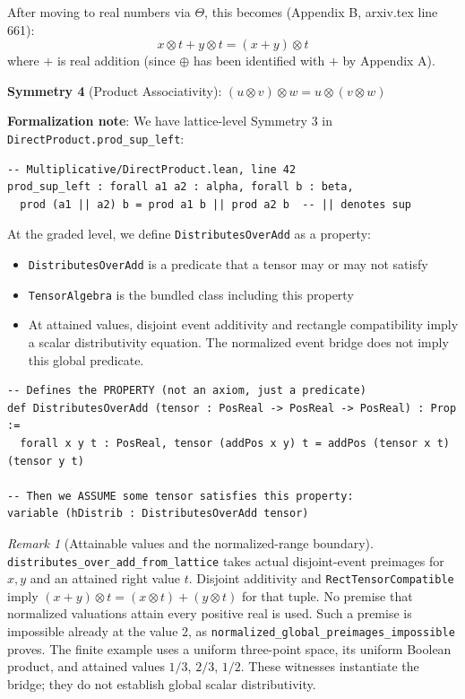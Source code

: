 \documentclass[11pt]{article}
\theoremstyle{definition}
\theoremstyle{remark}
\newtheorem{remark}[theorem]{Remark}
\begin{document}
After moving to real numbers via $\Theta$, this becomes (Appendix B, arxiv.tex line 661):
\[ x \otimes t + y \otimes t = (x + y) \otimes t \]
where $+$ is real addition (since $\oplus$ has been identified with $+$ by Appendix A).

\textbf{Symmetry 4} (Product Associativity): $(u \otimes v) \otimes w = u \otimes (v \otimes w)$

\textbf{Formalization note}: We have lattice-level Symmetry 3 in \texttt{DirectProduct.prod\_sup\_left}:
\begin{lstlisting}
-- Multiplicative/DirectProduct.lean, line 42
prod_sup_left : forall a1 a2 : alpha, forall b : beta,
  prod (a1 || a2) b = prod a1 b || prod a2 b  -- || denotes sup
\end{lstlisting}

At the graded level, we define \texttt{DistributesOverAdd} as a property:
\begin{itemize}
\item \texttt{DistributesOverAdd} is a predicate that a tensor may or may not satisfy
\item \texttt{TensorAlgebra} is the bundled class including this property
\item At attained values, disjoint event additivity and rectangle compatibility imply a scalar distributivity equation. The normalized event bridge does not imply this global predicate.
\end{itemize}

\begin{lstlisting}[caption={Distributivity property (\href{https://github.com/zariuq/ks-foundations-of-inference/blob/main/KnuthSkilling/Multiplicative/Basic.lean}{Multiplicative/Basic.lean})},numbers=none]
-- Defines the PROPERTY (not an axiom, just a predicate)
def DistributesOverAdd (tensor : PosReal -> PosReal -> PosReal) : Prop :=
  forall x y t : PosReal, tensor (addPos x y) t = addPos (tensor x t) (tensor y t)

-- Then we ASSUME some tensor satisfies this property:
variable (hDistrib : DistributesOverAdd tensor)
\end{lstlisting}

\begin{remark}[Attainable values and the normalized-range boundary]
\texttt{distributes\_over\_add\_from\_lattice} takes actual disjoint-event
preimages for $x,y$ and an attained right value $t$. Disjoint additivity and
\texttt{RectTensorCompatible} imply
$(x+y)\otimes t=(x\otimes t)+(y\otimes t)$ for that tuple.
No premise that normalized valuations attain every positive real is used.
Such a premise is impossible already at the value 2, as
\texttt{normalized\_global\_preimages\_impossible} proves.
The finite example uses a uniform three-point space, its uniform Boolean
product, and attained values $1/3$, $2/3$, $1/2$. These witnesses instantiate the
bridge; they do not establish global scalar distributivity.
\end{remark}
\end{document}
